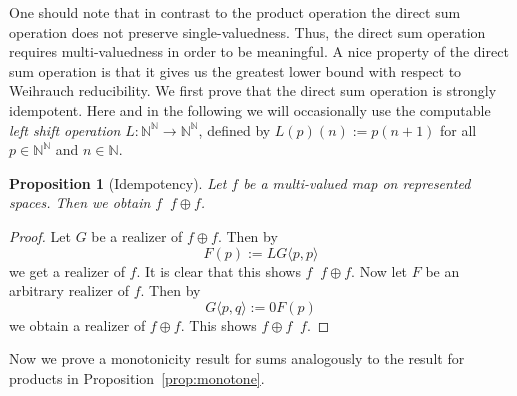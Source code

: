\documentclass[jsl,10pt]{noasl}
\def\IN{{\mathbb{N}}}
\def\leqSW{\mathop{\leq_{\mathrm{sW}}}}
\def\equivSW{\mathop{\equiv_{\mathrm{sW}}}}
\newtheorem{proposition}{Proposition}[section]
\begin{document}
One should note that in contrast to the product operation the direct sum
operation does not preserve single-valuedness. 
Thus, the direct sum operation requires multi-valuedness in order to be meaningful.
A nice property of the direct sum operation is that it gives us the
greatest lower bound with respect to Weihrauch reducibility.
We first prove that the direct sum operation is strongly idempotent.
Here and in the following we will occasionally use the computable {\em left shift operation}
$L:\IN^\IN\to\IN^\IN$, defined by $L(p)(n):=p(n+1)$ for all $p\in\IN^\IN$ and $n\in\IN$.

\begin{proposition}[Idempotency]
\label{prop:idempotent-sum}
Let $f$ be a multi-valued map on represented spaces. 
Then we obtain $f\equivSW f\oplus f$.
\end{proposition}
\begin{proof}
Let $G$ be a realizer of $f\oplus f$. 
Then by 
\[F(p):=LG\langle p,p\rangle\]
we get a realizer of $f$. It is clear that this shows $f\leqSW f\oplus f$.
Now let $F$ be an arbitrary realizer of $f$. Then by
\[G\langle p,q\rangle:=0F(p)\]
we obtain a realizer of $f\oplus f$. This shows $f\oplus f\leqSW f$.
\end{proof}

Now we prove a monotonicity result for sums analogously to the result for products in 
Proposition~\ref{prop:monotone}.
\end{document}
